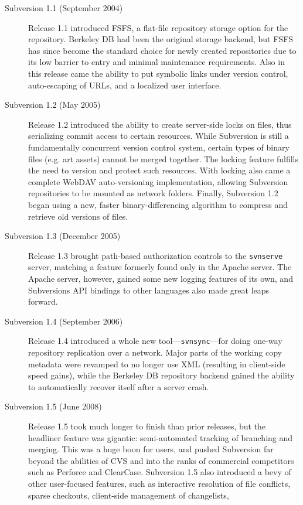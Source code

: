 \begin{description}
\item[Subversion 1.1 (September 2004)]
Release 1.1 introduced FSFS, a flat-file repository storage option for
the repository. Berkeley DB had been the original storage backend, but
FSFS has since become the standard choice for newly created
repositories due to its low barrier to entry and minimal maintenance
requirements. Also in this release came the ability to put symbolic
links under version control, auto-escaping of URLs, and a localized user
interface.
\item[Subversion 1.2 (May 2005)]
Release 1.2 introduced the ability to create server-side locks on files,
thus serializing commit access to certain resources. While Subversion is
still a fundamentally concurrent version control system, certain types
of binary files (e.g. art assets) cannot be merged together. The locking
feature fulfills the need to version and protect such resources. With
locking also came a complete WebDAV auto-versioning implementation,
allowing Subversion repositories to be mounted as network folders.
Finally, Subversion 1.2 began using a new, faster binary-differencing
algorithm to compress and retrieve old versions of files.
\item[Subversion 1.3 (December 2005)]
Release 1.3 brought path-based authorization controls to the
\texttt{svnserve} server, matching a feature formerly found only in the
Apache server. The Apache server, however, gained some new logging
features of its own, and Subversion\textquotesingle s API bindings to
other languages also made great leaps forward.
\item[Subversion 1.4 (September 2006)]
Release 1.4 introduced a whole new tool---\texttt{svnsync}---for doing
one-way repository replication over a network. Major parts of the
working copy metadata were revamped to no longer use XML (resulting in
client-side speed gains), while the Berkeley DB repository backend
gained the ability to automatically recover itself after a server crash.
\item[Subversion 1.5 (June 2008)]
Release 1.5 took much longer to finish than prior releases, but the
headliner feature was gigantic: semi-automated tracking of branching and
merging. This was a huge boon for users, and pushed Subversion far
beyond the abilities of CVS and into the ranks of commercial competitors
such as Perforce and ClearCase. Subversion 1.5 also introduced a bevy of
other user-focused features, such as interactive resolution of file
conflicts, sparse checkouts, client-side management of changelists,

\end{description}
